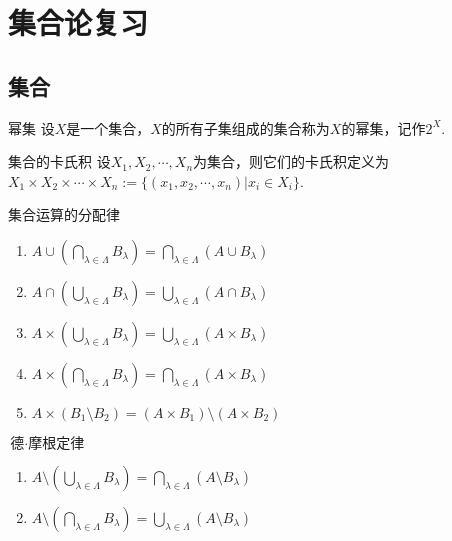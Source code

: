 \chapter{集合论复习}

\section{集合}

\begin{definition}{幂集}
    设$X$是一个集合，$X$的所有子集组成的集合称为$X$的幂集，记作$2^X$.
\end{definition}

\begin{definition}{集合的卡氏积}
    设$X_1,X_2,\cdots,X_n$为集合，则它们的卡氏积定义为$X_1\times X_2\times\cdots\times X_n := \big\{(x_1,x_2,\cdots,x_n)|x_i\in X_i\big\}$.
\end{definition}

\begin{proposition}{集合运算的分配律}
    \wideline
    \begin{enumerate}
        \item $A\cup \left(\bigcap_{\lambda\in\Lambda}B_\lambda\right)=\bigcap_{\lambda\in\Lambda}{\left(A\cup B_\lambda\right)}$
        \item $A\cap \left(\bigcup_{\lambda\in\Lambda}B_\lambda\right)=\bigcup_{\lambda\in\Lambda}{\left(A\cap B_\lambda\right)}$
        \item $A\times \left(\bigcup_{\lambda\in\Lambda}B_\lambda\right)=\bigcup_{\lambda\in\Lambda}{\left(A\times B_\lambda\right)}$
        \item $A\times \left(\bigcap_{\lambda\in\Lambda}B_\lambda\right)=\bigcap_{\lambda\in\Lambda}{\left(A\times B_\lambda\right)}$
        \item $A\times \left(B_1\setminus B_2\right)=(A\times B_1)\setminus (A\times B_2)$
    \end{enumerate}
\end{proposition}

\begin{theorem}{$\text{德}\cdot\text{摩根定律}$}
    \wideline
    \begin{enumerate}
        \item $A\setminus \left(\bigcup_{\lambda\in\Lambda}{B_{\lambda}}\right)=\bigcap_{\lambda\in\Lambda}{\left(A\setminus B_{\lambda}\right)}$
        \item $A\setminus \left(\bigcap_{\lambda\in\Lambda}{B_{\lambda}}\right)=\bigcup_{\lambda\in\Lambda}{\left(A\setminus B_{\lambda}\right)}$
    \end{enumerate}
\end{theorem}

